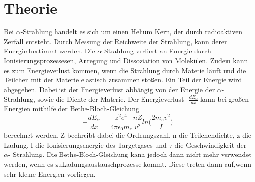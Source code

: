 \section{Theorie}
\label{sec:Theorie}

Bei $\alpha$-Strahlung handelt es sich um einen Helium Kern, der durch radioaktiven Zerfall entsteht.
Durch Messung der Reichweite der Strahlung, kann deren Energie bestimmt werden.
Die $\alpha$-Strahlung verliert an Energie durch Ionisierungsprozessesen, Anregung und Dissoziation von Molekülen.
Zudem kann es zum Energieverlust kommen, wenn die Strahlung durch Materie läuft und die Teilchen mit der Materie elastisch zusammen stoßen.
Ein Teil der Energie wird abgegeben.
Dabei ist der Energieverlust abhängig von der Energie der $\alpha$-Strahlung, sowie die Dichte der Materie.
Der Energieverlust -$\frac{dE_\alpha}{dx}$ kann bei großen Energien mithilfe der Bethe-Bloch-Gleichung 
\begin{equation}
    -\frac{dE_\alpha}{dx} = \frac{z^2 e^4}{4 \pi \epsilon_0 m_e}
     \frac{n Z}{v^2}ln\biggl(\frac{2 m_e v^2}{I}\biggr)
\end{equation}
berechnet werden.
Z bechreibt dabei die Ordnungszahl, n die Teilchendichte, z die Ladung, I die Ionisierungsenergie des Targetgases und v die Geschwindigkeit der $\alpha$- Strahlung.
Die Bethe-Bloch-Gleichung kann jedoch dann nicht mehr verwendet werden, wenn es zuLadungsaustauschprozesse kommt. 
Diese treten dann auf,wenn sehr kleine Energien vorliegen.



\cite{sample}
